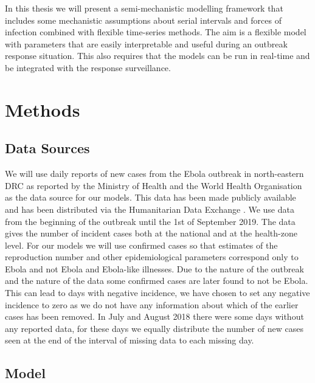 \documentclass[12pt]{article}
\begin{document}
In this thesis we will present a semi-mechanistic modelling framework that includes some mechanistic assumptions about serial intervals and forces of infection combined with flexible time-series methods. The aim is a flexible model with parameters that are easily interpretable and useful during an outbreak response situation. This also requires that the models can be run in real-time and be integrated with the response surveillance. 

\section{Methods}

\subsection{Data Sources}

We will use daily reports of new cases from the Ebola outbreak in north-eastern DRC as reported by the Ministry of Health and the World Health Organisation as the data source for our models. This data has been made publicly available and has been distributed via the Humanitarian Data Exchange \cite{hummanitariandataexchangeEbolaCasesDeaths}. We use data from the beginning of the outbreak until the 1st of September 2019. The data gives the number of incident cases both at the national and at the health-zone level. For our models we will use confirmed cases so that estimates of the reproduction number and other epidemiological parameters correspond only to Ebola and not Ebola and Ebola-like illnesses. Due to the nature of the outbreak and the nature of the data some confirmed cases are later found to not be Ebola. This can lead to days with negative incidence, we have chosen to set any negative incidence to zero as we do not have any information about which of the earlier cases has been removed. In July and August 2018 there were some days without any reported data, for these days we equally distribute the number of new cases seen at the end of the interval of missing data to each missing day. 

\subsection{Model}
\end{document}

